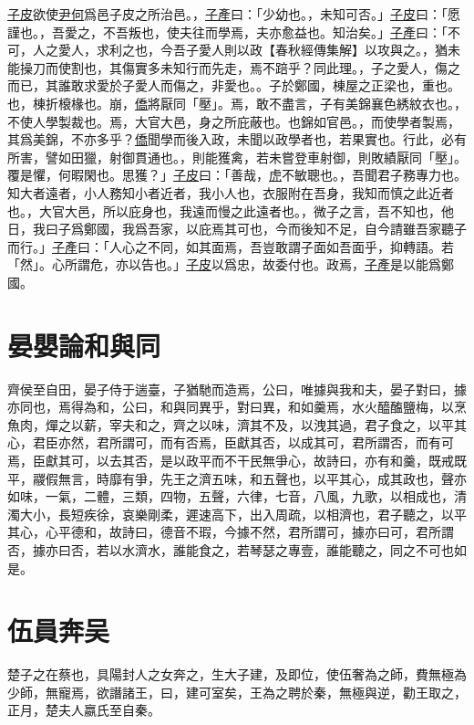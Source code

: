 \documentclass{article}
\newcommand{\tsu}{\small\kaishu\color{brown}}
\newcommand{\ta}{\small\kaishu\color{applegreen}}
\begin{document}
\uline{子皮}欲使\uline{尹何}爲邑{\tsu 子皮之所治邑。}，\uline{子產}曰：「少{\tsu 幼也。}，未知可否。」\uline{子皮}曰：「愿{\tsu 謹也。}，吾愛之，不吾叛也，使夫往而學焉，夫亦愈{\tsu 益也。}知治矣。」\uline{子產}曰：「不可，人之愛人，求利之也，今吾子愛人則以政{\ta 【春秋經傳集解】以攻與之。}，猶未能操刀而使割也，其傷實多{\tsu 未知行而先走，焉不踣乎？同此理。}，子之愛人，傷之而已，其誰敢求愛於子{\tsu 愛人而傷之，非愛也。}。子於鄭國，棟{\tsu 屋之正梁也，重也。}也，棟折榱{\tsu 椽也。}崩，\uline{僑}將厭{\tsu 同「壓」。}焉，敢不盡言，子有美錦{\tsu 襄色綉紋衣也。}，不使人學製{\tsu 裁也。}焉，大官大邑，身之所庇{\tsu 蔽也。}也{\tsu 錦如官邑。}，而使學者製焉，其爲美錦，不亦多乎？\uline{僑}聞學而後入政，未聞以政學者也，若果{\tsu 實也。}行此，必有所害，譬如田獵，射御貫{\tsu 通也。}，則能獲禽，若未嘗登車射御，則敗績厭{\tsu 同「壓」。}覆是懼，何暇{\tsu 閑也。}思獲？」\uline{子皮}曰：「善哉，\uline{虎}不敏{\tsu 聰也。}，吾聞君子務{\tsu 專力也。}知大者遠者，小人務知小者近者，我小人也，衣服附在吾身，我知而慎之{\tsu 此近者也。}，大官大邑，所以庇身也，我遠而慢之{\tsu 此遠者也。}，微子之言，吾不知也，他日，我曰子爲鄭國，我爲吾家，以庇焉其可也，今而後知不足，自今請雖吾家聽子而行。」\uline{子產}曰：「人心之不同，如其面焉，吾豈敢謂子面如吾面乎，抑{\tsu 轉語。若「然」。}心所謂危，亦以告也。」\uline{子皮}以爲忠，故委{\tsu 付也。}政焉，\uline{子產}是以能爲鄭國。
\section{晏嬰論和與同}

齊侯至自田，晏子侍于遄臺，子猶馳而造焉，公曰，唯據與我和夫，晏子對曰，據亦同也，焉得為和，公曰，和與同異乎，對曰異，和如羹焉，水火醯醢鹽梅，以烹魚肉，燀之以薪，宰夫和之，齊之以味，濟其不及，以洩其過，君子食之，以平其心，君臣亦然，君所謂可，而有否焉，臣獻其否，以成其可，君所謂否，而有可焉，臣獻其可，以去其否，是以政平而不干民無爭心，故詩曰，亦有和羹，既戒既平，鬷假無言，時靡有爭，先王之濟五味，和五聲也，以平其心，成其政也，聲亦如味，一氣，二體，三類，四物，五聲，六律，七音，八風，九歌，以相成也，清濁大小，長短疾徐，哀樂剛柔，遲速高下，出入周疏，以相濟也，君子聽之，以平其心，心平德和，故詩曰，德音不瑕，今據不然，君所謂可，據亦曰可，君所謂否，據亦曰否，若以水濟水，誰能食之，若琴瑟之專壹，誰能聽之，同之不可也如是。

\section{伍員奔吴}

楚子之在蔡也，具陽封人之女奔之，生大子建，及即位，使伍奢為之師，費無極為少師，無寵焉，欲譖諸王，曰，建可室矣，王為之聘於秦，無極與逆，勸王取之，正月，楚夫人嬴氏至自秦。
\end{document}
